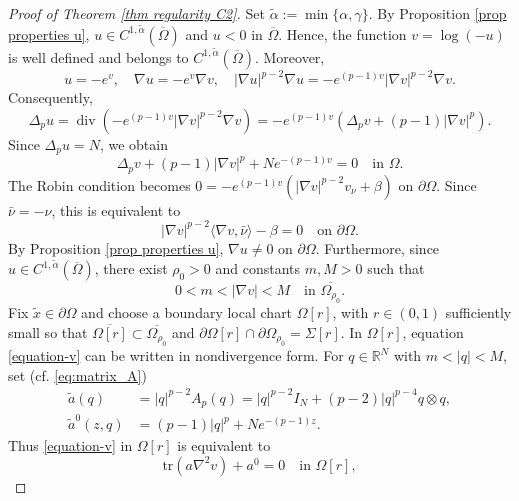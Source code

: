 \documentclass[10pt,a4paper, reqno]{amsart}
\numberwithin{equation}{section}
\newcommand{\R}{\mathbb{R}}
\renewcommand{\div}{\operatorname{div}}
\begin{document}
\begin{proof}[Proof of Theorem \ref{thm regularity C2}]
Set $\tilde{\alpha}:= \min\{ \alpha, \gamma\}$. By Proposition \ref{prop properties u}, $u \in C^{1,\tilde{\alpha}}(\overline\Omega)$ and $u<0$ in $\overline\Omega$. Hence, the function $v=\log(-u)$ is well defined and belongs to $C^{1,\tilde{\alpha}}(\overline\Omega)$. Moreover,
\[
    u=-e^v,\quad\nabla u=-e^v\nabla v,\quad|\nabla u|^{p-2}\nabla u=-e^{(p-1)v}|\nabla v|^{p-2}\nabla v.
\]
Consequently,
\begin{equation*}
    \Delta_p u =\div\left(-e^{(p-1)v}|\nabla v|^{p-2}\nabla v\right)=-e^{(p-1)v}\left(\Delta_p v+(p-1)|\nabla v|^p\right).
\end{equation*}
Since $\Delta_p u=N$, we obtain
\begin{equation}\label{equation-v}
    \Delta_p v+(p-1)|\nabla v|^p+N e^{-(p-1)v}=0\quad\text{in }\Omega.
\end{equation}
The Robin condition becomes $0=-e^{(p-1)v}\left(|\nabla v|^{p-2}v_\nu+\beta\right)$ on $\partial\Omega$.
Since $\bar{\nu}=-\nu$, this is equivalent to
\begin{equation}\label{boundary-v}
    |\nabla v|^{p-2}\langle\nabla v,\bar{\nu} \rangle-\beta=0\quad\text{on }\partial\Omega.
\end{equation}
By Proposition \ref{prop properties u}, $\nabla u \neq 0$ on $\partial\Omega$. Furthermore, since $u\in C^{1,\tilde{\alpha}}(\overline\Omega)$, there exist $\rho_0>0$ and constants $m,M>0$ such that
\begin{equation}\label{nablav-bounds}
    0<m<|\nabla v|<M\quad\text{in }\overline{\Omega_{\rho_0}}.
\end{equation}
Fix $\tilde{x}\in\partial\Omega$ and choose a boundary local chart $\Omega[r]$, with $r \in (0,1)$ sufficiently small so that $\overline{\Omega[r]} \subset \overline{\Omega_{\rho_0}}$ and $\partial \Omega[r] \cap \partial \Omega_{\rho_0} = \Sigma[r]$.
In $\Omega[r]$, equation \eqref{equation-v} can be written in nondivergence form. For $q\in\R^N$ with $m<|q|<M$, set (cf. \eqref{eq:matrix_A})
\begin{align*}
    \tilde{a}(q)&= |q|^{p-2} A_p(q) = |q|^{p-2} I_N +(p-2)|q|^{p-4} q \otimes q,\\
    \tilde{a}^0(z,q)&=(p-1)|q|^p+N e^{-(p-1)z}.
\end{align*}
Thus \eqref{equation-v} in $\Omega[r]$ is equivalent to
\begin{equation}\label{eq-nondiv}
    \mathrm{tr} (a \nabla^2 v) + a^0=0 \quad\text{in }\Omega[r],

\end{equation}
\end{proof}
\end{document}
